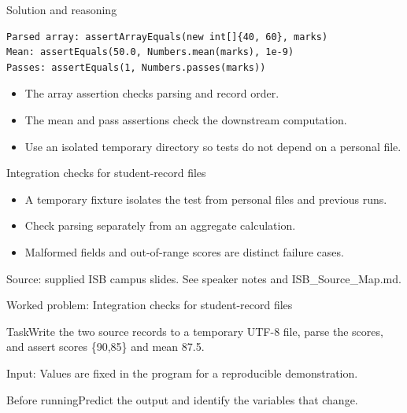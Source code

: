 \documentclass[10pt,aspectratio=169]{beamer}
\begin{document}
\begin{frame}[fragile,t]{Solution and reasoning}
\begin{lstlisting}
Parsed array: assertArrayEquals(new int[]{40, 60}, marks)
Mean: assertEquals(50.0, Numbers.mean(marks), 1e-9)
Passes: assertEquals(1, Numbers.passes(marks))
\end{lstlisting}\vspace{1mm}\small\begin{itemize}
\item The array assertion checks parsing and record order.
\item The mean and pass assertions check the downstream computation.
\item Use an isolated temporary directory so tests do not depend on a personal file.
\end{itemize}
\end{frame}

\begin{frame}[fragile,t]{Integration checks for student{-}record files}
\begin{itemize}
\item A temporary fixture isolates the test from personal files and previous runs.
\item Check parsing separately from an aggregate calculation.
\item Malformed fields and out{-}of{-}range scores are distinct failure cases.
\end{itemize}
\vspace{3mm}\footnotesize\textcolor{accent}{Source: supplied ISB campus slides. See speaker notes and ISB\_Source\_Map.md.}
\end{frame}

\begin{frame}[fragile,t]{Worked problem: Integration checks for student{-}record files}
\begin{block}{Task}Write the two source records to a temporary UTF{-}8 file, parse the scores, and assert scores \{90,85\} and mean 87.5.\end{block}
\small Input: Values are fixed in the program for a reproducible demonstration.\par\vspace{3mm}\begin{exampleblock}{Before running}Predict the output and identify the variables that change.\end{exampleblock}
\end{frame}
\end{document}
